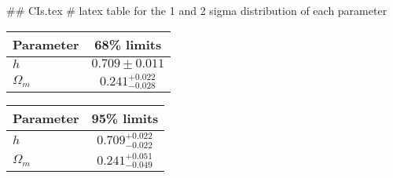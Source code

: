 ## CIs.tex
# latex table for the 1 and 2 sigma distribution of each parameter

\begin{tabular} { l  c}
 Parameter &  68\% limits\\
\hline
{\boldmath$h              $} & $0.709\pm 0.011            $\\
{\boldmath$\Omega_m       $} & $0.241^{+0.022}_{-0.028}   $\\
\hline
\end{tabular}

\begin{tabular} { l  c}
 Parameter &  95\% limits\\
\hline
{\boldmath$h              $} & $0.709^{+0.022}_{-0.022}   $\\
{\boldmath$\Omega_m       $} & $0.241^{+0.051}_{-0.049}   $\\
\hline
\end{tabular}
